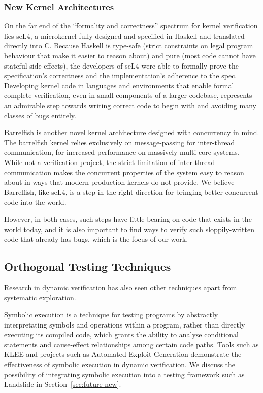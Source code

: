\subsubsection{New Kernel Architectures}

On the far end of the ``formality and correctness'' spectrum for kernel verification lies seL4\cite{sel4}, a microkernel fully designed and specified in Haskell and translated directly into C. Because Haskell is type-safe (strict constraints on legal program behaviour that make it easier to reason about) and pure (most code cannot have stateful side-effects), the developers of seL4 were able to formally prove the specification's correctness and the implementation's adherence to the spec.
Developing kernel code in languages and environments that enable formal complete verification, even in small components of a larger codebase, represents an admirable step towards writing correct code to begin with and avoiding many classes of bugs entirely.

Barrelfish\cite{barrelfish} is another novel kernel architecture designed with concurrency in mind. The barrelfish kernel relies exclusively on message-passing for inter-thread communication, for increased performance on massively multi-core systems. While not a verification project, the strict limitation of inter-thread communication makes the concurrent properties of the system easy to reason about in ways that modern production kernels do not provide.
We believe Barrelfish, like seL4, is a step in the right direction for bringing better concurrent code into the world.

However, in both cases, such steps have little bearing on code that exists in the world today, and it is also important to find ways to verify such sloppily-written code that already has bugs, which is the focus of our work.

\subsection{Orthogonal Testing Techniques}

Research in dynamic verification has also seen other techniques apart from systematic exploration.

Symbolic execution\cite{symbolic,symbolic-disks} is a technique for testing programs by abstractly interpretating symbols and operations within a program, rather than directly executing its compiled code, which grants the ability to analyse conditional statements and cause-effect relationships among certain code paths.
Tools such as KLEE\cite{klee} and projects such as Automated Exploit Generation\cite{aeg} demonstrate the effectiveness of symbolic execution in dynamic verification.
We discuss the possibility of integrating symbolic execution into a testing framework such as Landslide in Section~\ref{sec:future-new}.

